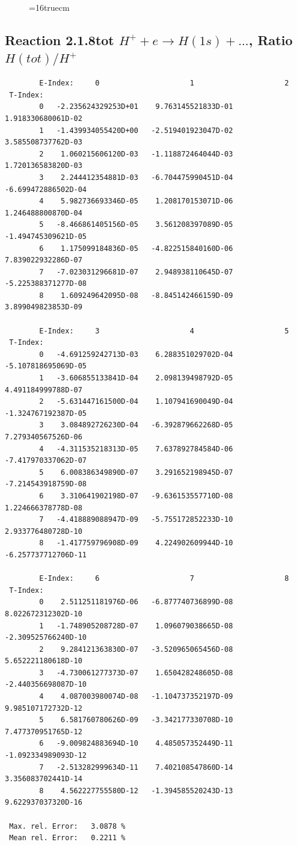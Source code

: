 \documentclass[12pt,dvips]{article}
\begin{document}
\begin{figure} \label{2.1.8re}
\epsfxsize=16truecm
\end{figure}
\newpage


\subsection{
Reaction 2.1.8tot  $H^+ + e \rightarrow H(1s) + ...$, Ratio $H(tot)/H^+$
}

\begin{small}\begin{verbatim}
        E-Index:     0                     1                     2
 T-Index:
        0   -2.235624329253D+01    9.763145521833D-01    1.918330680061D-02
        1   -1.439934055420D+00   -2.519401923047D-02    3.585508737762D-03
        2    1.060215606120D-03   -1.118872464044D-03    1.720136583820D-03
        3    2.244412354881D-03   -6.704475990451D-04   -6.699472886502D-04
        4    5.982736693346D-05    1.208170153071D-06    1.246488800870D-04
        5   -8.466861405156D-05    3.561208397089D-05   -1.494745309621D-05
        6    1.175099184836D-05   -4.822515840160D-06    7.839022932286D-07
        7   -7.023031296681D-07    2.948938110645D-07   -5.225388371277D-08
        8    1.609249642095D-08   -8.845142466159D-09    3.899049823853D-09

        E-Index:     3                     4                     5
 T-Index:
        0   -4.691259242713D-03    6.288351029702D-04   -5.107818695069D-05
        1   -3.606855133841D-04    2.098139498792D-05    4.491184999788D-07
        2   -5.631447161500D-04    1.107941690049D-04   -1.324767192387D-05
        3    3.084892726230D-04   -6.392879662268D-05    7.279340567526D-06
        4   -4.311535218313D-05    7.637892784584D-06   -7.417970337062D-07
        5    6.008386349890D-07    3.291652198945D-07   -7.214543918759D-08
        6    3.310641902198D-07   -9.636153557710D-08    1.224666378778D-08
        7   -4.418889088947D-09   -5.755172852233D-10    2.933776480728D-10
        8   -1.417759796908D-09    4.224902609944D-10   -6.257737712706D-11

        E-Index:     6                     7                     8
 T-Index:
        0    2.511251181976D-06   -6.877740736899D-08    8.022672312302D-10
        1   -1.748905208728D-07    1.096079038665D-08   -2.309525766240D-10
        2    9.284121363830D-07   -3.520965065456D-08    5.652221180618D-10
        3   -4.730061277373D-07    1.650428248605D-08   -2.440356698087D-10
        4    4.087003980074D-08   -1.104737352197D-09    9.985107172732D-12
        5    6.581760780626D-09   -3.342177330708D-10    7.477370951765D-12
        6   -9.009824883694D-10    4.485057352449D-11   -1.092334989093D-12
        7   -2.513282999634D-11    7.402108547860D-14    3.356083702441D-14
        8    4.562227755580D-12   -1.394585520243D-13    9.622937037320D-16

 Max. rel. Error:   3.0878 %
 Mean rel. Error:   0.2211 %

\end{verbatim}\end{small}
\end{document}
